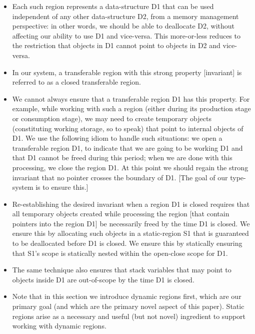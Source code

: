 \begin{itemize}


\item
Each such region represents a data-structure D1 that can be used independent of any other data-structure D2, from a memory management perspective: in other words, we should be able to deallocate D2, without affecting our ability to use D1 and vice-versa. This more-or-less reduces to the restriction that objects in D1 cannot point to objects in D2 and vice-versa.
\item
In our system, a transferable region with this strong property [invariant] is referred to as a closed transferable region.  

\item
We cannot always ensure that a transferable region D1 has this property. For example, while working with such a region (either during its production stage or consumption stage), we may need to create temporary objects (constituting working storage, so to speak) that point to internal objects of D1. We use the following idiom to handle such situations: we open a transferable region D1, to indicate that we are going to be working D1 and that D1 cannot be freed during this period; when we are done with this processing, we close the region D1. At this point we should regain the strong invariant that no pointer crosses the boundary of D1. [The goal of our type-system is to ensure this.]

\item
Re-establishing the desired invariant when a region D1 is closed requires that all temporary objects created while processing the region [that contain pointers into the region D1] be necessarily freed by the time D1 is closed. We ensure this by allocating such objects in a static-region S1 that is guaranteed to be deallocated before D1 is closed. We ensure this by statically ensuring that S1's scope is statically nested within the open-close scope for D1.

\item
The same technique also ensures that stack variables that may point to objects inside D1 are out-of-scope by the time D1 is closed.

\item
Note that in this section we introduce dynamic regions first, which are our primary goal (and which are the primary novel aspect of this paper). Static regions arise as a necessary and useful (but not novel) ingredient to support working with dynamic regions.


\end{itemize}
